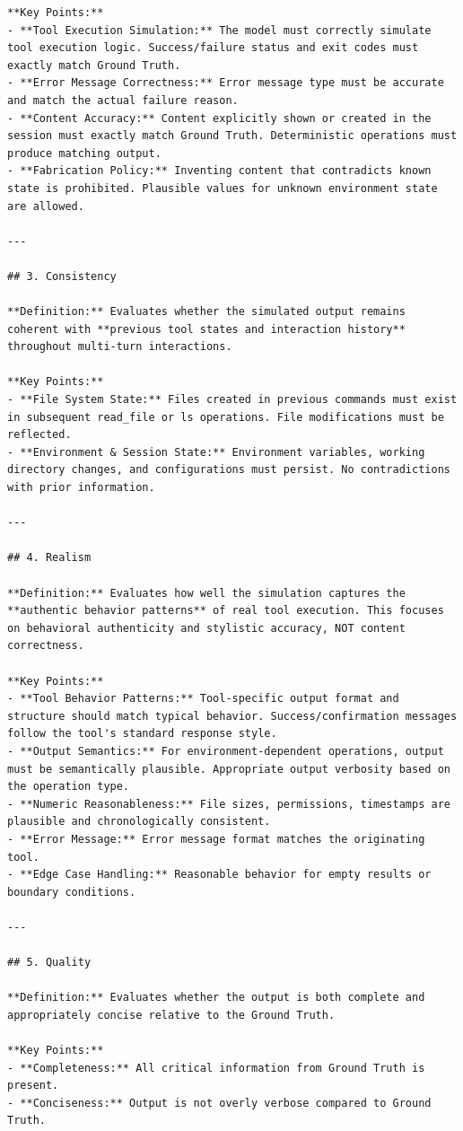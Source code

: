 \begin{lstlisting}
**Key Points:**
- **Tool Execution Simulation:** The model must correctly simulate tool execution logic. Success/failure status and exit codes must exactly match Ground Truth.
- **Error Message Correctness:** Error message type must be accurate and match the actual failure reason.
- **Content Accuracy:** Content explicitly shown or created in the session must exactly match Ground Truth. Deterministic operations must produce matching output.
- **Fabrication Policy:** Inventing content that contradicts known state is prohibited. Plausible values for unknown environment state are allowed.

---

## 3. Consistency

**Definition:** Evaluates whether the simulated output remains coherent with **previous tool states and interaction history** throughout multi-turn interactions.

**Key Points:**
- **File System State:** Files created in previous commands must exist in subsequent read_file or ls operations. File modifications must be reflected.
- **Environment & Session State:** Environment variables, working directory changes, and configurations must persist. No contradictions with prior information.

---

## 4. Realism

**Definition:** Evaluates how well the simulation captures the **authentic behavior patterns** of real tool execution. This focuses on behavioral authenticity and stylistic accuracy, NOT content correctness.

**Key Points:**
- **Tool Behavior Patterns:** Tool-specific output format and structure should match typical behavior. Success/confirmation messages follow the tool's standard response style.
- **Output Semantics:** For environment-dependent operations, output must be semantically plausible. Appropriate output verbosity based on the operation type.
- **Numeric Reasonableness:** File sizes, permissions, timestamps are plausible and chronologically consistent.
- **Error Message:** Error message format matches the originating tool.
- **Edge Case Handling:** Reasonable behavior for empty results or boundary conditions.

---

## 5. Quality

**Definition:** Evaluates whether the output is both complete and appropriately concise relative to the Ground Truth.

**Key Points:**
- **Completeness:** All critical information from Ground Truth is present.
- **Conciseness:** Output is not overly verbose compared to Ground Truth.
\end{lstlisting}

